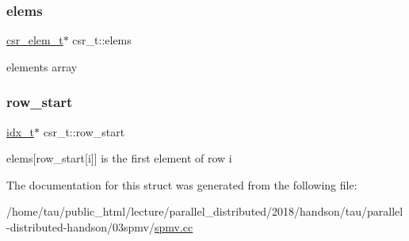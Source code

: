 \subsubsection{\texorpdfstring{elems}{elems}}
{\footnotesize\ttfamily \hyperlink{structcsr__elem__t}{csr\+\_\+elem\+\_\+t}$\ast$ csr\+\_\+t\+::elems}

elements array \mbox{\label{structcsr__t_ac52d7a1ff3a054e2b8c7fcc706e525b6}} 
\subsubsection{\texorpdfstring{row\+\_\+start}{row\_start}}
{\footnotesize\ttfamily \hyperlink{spmv_8cc_a8e93478a00e685bea5e6a3f617bf03a3}{idx\+\_\+t}$\ast$ csr\+\_\+t\+::row\+\_\+start}

elems\mbox{[}row\+\_\+start\mbox{[}i\mbox{]}\mbox{]} is the first element of row i 

The documentation for this struct was generated from the following file\+:\begin{DoxyCompactItemize}
\item 
/home/tau/public\+\_\+html/lecture/parallel\+\_\+distributed/2018/handson/tau/parallel-\/distributed-\/handson/03spmv/\hyperlink{spmv_8cc}{spmv.\+cc}\end{DoxyCompactItemize}
